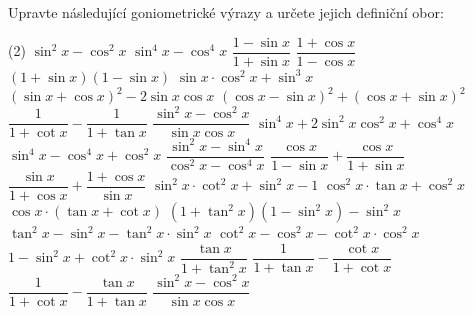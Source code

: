 \documentclass[12pt,a4paper]{article}
\begin{document}
\begin{exercise}[Upravte I.]
    Upravte následující goniometrické výrazy a určete jejich definiční obor:
    \begin{tasks}(2)
        \task $\sin^2 x - \cos^2 x$
        \task $\sin^4 x - \cos^4 x$
        \task $\dfrac{1 - \sin x}{1 + \sin x}$
        \task $\dfrac{1 + \cos x}{1 - \cos x}$
        \task $\left(1 + \sin x\right)\left(1 - \sin x\right)$
        \task $\sin x \cdot \cos^2 x + \sin^3 x$
        \task $\left(\sin x + \cos x\right)^2 - 2\sin x \cos x$
        \task $\left(\cos x - \sin x\right)^2 + \left(\cos x + \sin x\right)^2$
        \task $\dfrac{1}{1 + \cot x} - \dfrac{1}{1 + \tan x}$
        \task $\dfrac{\sin^2 x - \cos^2 x}{\sin x \cos x}$
        \task $\sin^4 x + 2 \sin^2 x \cos^2 x + \cos^4 x$
        \task $\sin^4 x - \cos^4 x + \cos^2 x$
        \task $\dfrac{\sin^2 x - \sin^4 x}{\cos^2 x - \cos^4 x}$
        \task $\dfrac{\cos x}{1 - \sin x} + \dfrac{\cos x}{1 + \sin x}$
        \task $\dfrac{\sin x}{1 + \cos x} + \dfrac{1 + \cos x}{\sin x}$
        \task $\sin^2 x \cdot \cot^2 x + \sin^2 x - 1$
        \task $\cos^2 x \cdot \tan x + \cos^2 x$
        \task $\cos x \cdot \left(\tan x + \cot x\right)$
        \task $\left(1 + \tan^2 x\right)\left(1 - \sin^2 x\right) - \sin^2 x$
        \task $\tan^2 x - \sin^2 x - \tan^2 x \cdot \sin^2 x$
        \task $\cot^2 x - \cos^2 x - \cot^2 x \cdot \cos^2 x$
        \task $1 - \sin^2 x + \cot^2 x \cdot \sin^2 x$        
        \task $\dfrac{\tan x}{1 + \tan^2 x}$
        \task $\dfrac{1}{1 + \tan x} - \dfrac{\cot x}{1 + \cot x}$
        \task $\dfrac{1}{1 + \cot x} - \dfrac{\tan x}{1 + \tan x}$
        \task $\dfrac{\sin^2 x - \cos^2 x}{\sin x \cos x}$

    \end{tasks}
\end{exercise}
\end{document}
